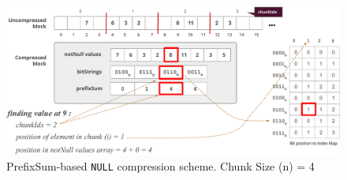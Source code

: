 



\begin{figure}
	\hfill\includegraphics[scale=0.70]{img/null2}\hspace*{\fill}
	\captionsetup{justification=centering}
	\caption{PrefixSum-based \texttt{NULL} compression scheme. Chunk Size (n) = 4}
	\label{fig:null2}
\end{figure}


